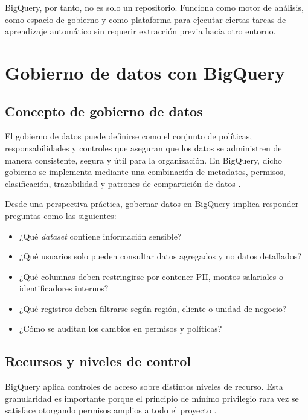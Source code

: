 \documentclass[12pt]{article}
\begin{document}
BigQuery, por tanto, no es solo un repositorio. Funciona como motor de análisis, como espacio de gobierno y como plataforma para ejecutar ciertas tareas de aprendizaje automático sin requerir extracción previa hacia otro entorno.

\section{Gobierno de datos con BigQuery}
\subsection{Concepto de gobierno de datos}
El gobierno de datos puede definirse como el conjunto de políticas, responsabilidades y controles que aseguran que los datos se administren de manera consistente, segura y útil para la organización. En BigQuery, dicho gobierno se implementa mediante una combinación de metadatos, permisos, clasificación, trazabilidad y patrones de compartición de datos \cite{gcp_bigquery_governance}.

Desde una perspectiva práctica, gobernar datos en BigQuery implica responder preguntas como las siguientes:

\begin{itemize}[leftmargin=*]
\item ¿Qué \textit{dataset} contiene información sensible?
\item ¿Qué usuarios solo pueden consultar datos agregados y no datos detallados?
\item ¿Qué columnas deben restringirse por contener PII, montos salariales o identificadores internos?
\item ¿Qué registros deben filtrarse según región, cliente o unidad de negocio?
\item ¿Cómo se auditan los cambios en permisos y políticas?
\end{itemize}

\subsection{Recursos y niveles de control}
BigQuery aplica controles de acceso sobre distintos niveles de recurso. Esta granularidad es importante porque el principio de mínimo privilegio rara vez se satisface otorgando permisos amplios a todo el proyecto \cite{gcp_bigquery_iam,gcp_bigquery_basic_roles}.
\end{document}
